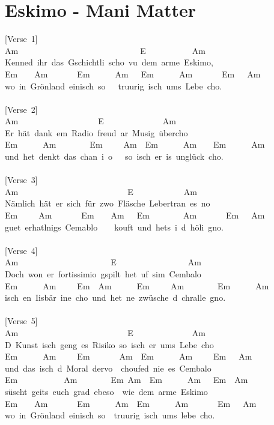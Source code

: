 \documentclass[]{book}
\let\stdsection\section
\renewcommand\section{\clearpage\stdsection}
\begin{document}
\hypertarget{eskimo---mani-matter}{%
\section{Eskimo - Mani Matter}\label{eskimo---mani-matter}}

{[}Verse~1{]}\\
Am~~~~~~~~~~~~~~~~~~~~~~~~~~~~~E~~~~~~~~~~~Am\\
Kenned~ihr~das~Gschichtli~scho~vu~dem~arme~Eskimo,\\
Em~~~~Am~~~~~~~Em~~~~~~Am~~~Em~~~~~~Am~~~~~~~Em~~~Am\\
wo~in~Grönland~einisch~so~~~truurig~isch~ums~Lebe~cho.\\
~\\
{[}Verse~2{]}\\
Am~~~~~~~~~~~~~~~~~~~E~~~~~~~~~~~~~~Am\\
Er~hät~dank~em~Radio~freud~ar~Musig~übercho\\
Em~~~~~~Am~~~~~~~~Em~~~~~Am~~Em~~~~~~Am~~~~Em~~~~~~Am\\
und~het~denkt~das~chan~i~o~~~so~isch~er~is~unglück~cho.\\
~\\
{[}Verse~3{]}\\
Am~~~~~~~~~~~~~~~~~~~~~~~~~~E~~~~~~~~~~~~Am\\
Nämlich~hät~er~sich~für~zwo~Fläsche~Lebertran~es~no\\
Em~~~~~Am~~~~~~~Em~~~~Am~~~Em~~~~~~~~Am~~~~~~~Em~~~Am\\
guet~erhatlnigs~Cemablo~~~~kouft~und~hets~i~d~höli~gno.\\
~\\
{[}Verse~4{]}\\
Am~~~~~~~~~~~~~~~~~~~~~~E~~~~~~~~~~~~~~~~~Am\\
Doch~won~er~fortissimio~gspilt~het~uf~sim~Cembalo\\
Em~~~~~~Am~~~~~Em~~Am~~~~~~Em~~~~~Am~~~~~~~~Em~~~~~~Am\\
isch~en~Iisbär~ine~cho~und~het~ne~zwüsche~d~chralle~gno.\\
~\\
{[}Verse~5{]}\\
Am~~~~~~~~~~~~~~~~~~~~~~~~~~E~~~~~~~~~~~~~~Am\\
D~Kunst~isch~geng~es~Risiko~so~isch~er~ums~Lebe~cho\\
Em~~~~~~Am~~~~~Em~~~~~~~Am~~Em~~~~~~Am~~~~~Em~~~Am\\
und~das~isch~d~Moral~dervo~~choufed~nie~es~Cembalo\\
Em~~~~~~~~~~~Am~~~~~~~~Em~Am~~Em~~~~~~Am~~~Em~~Am\\
süscht~geits~euch~grad~ebeso~~wie~dem~arme~Eskimo\\
Em~~~~Am~~~~~~~Em~~~~~~Am~~Em~~~~~~Am~~~~~~~Em~~~Am\\
wo~in~Grönland~einisch~so~~truurig~isch~ums~lebe~cho.\\
~\\
~\\
\end{document}

